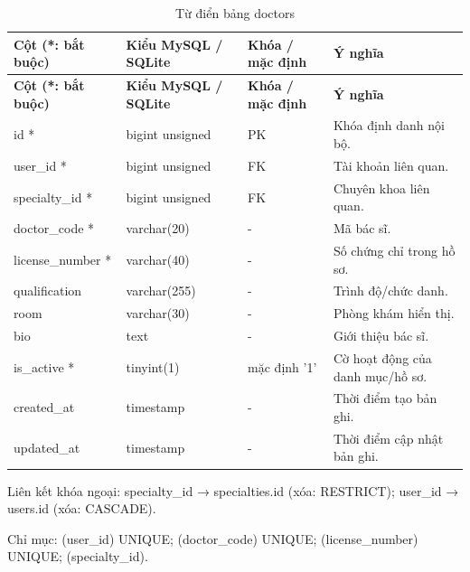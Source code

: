 {\fontsize{10}{12}\selectfont\setlength{\tabcolsep}{3pt}\renewcommand{\arraystretch}{1.12}
\begin{longtable}{@{}L{\textwidth-4.86pt\relax} L{\textwidth-3.96pt\relax} L{\textwidth-2.88pt\relax} L{\textwidth-6.3pt\relax}@{}}
\caption{Từ điển bảng doctors}\\
\toprule
\textbf{Cột (*:\allowbreak{} bắt buộc)} & \textbf{Kiểu My\allowbreak{}SQL /\allowbreak{} SQLite} & \textbf{Khóa /\allowbreak{} mặc định} & \textbf{Ý nghĩa}\\\midrule
\endfirsthead
\toprule
\textbf{Cột (*:\allowbreak{} bắt buộc)} & \textbf{Kiểu My\allowbreak{}SQL /\allowbreak{} SQLite} & \textbf{Khóa /\allowbreak{} mặc định} & \textbf{Ý nghĩa}\\\midrule
\endhead
\bottomrule\endlastfoot
id * & bigint unsigned & PK & Khóa định danh nội bộ.\allowbreak{}\\[1pt]
user\_\allowbreak{}id * & bigint unsigned & FK & Tài khoản liên quan.\allowbreak{}\\[1pt]
specialty\_\allowbreak{}id * & bigint unsigned & FK & Chuyên khoa liên quan.\allowbreak{}\\[1pt]
doctor\_\allowbreak{}code * & varchar(20) & - & Mã bác sĩ.\allowbreak{}\\[1pt]
license\_\allowbreak{}number * & varchar(40) & - & Số chứng chỉ trong hồ sơ.\allowbreak{}\\[1pt]
qualification & varchar(255) & - & Trình độ/\allowbreak{}chức danh.\allowbreak{}\\[1pt]
room & varchar(30) & - & Phòng khám hiển thị.\allowbreak{}\\[1pt]
bio & text & - & Giới thiệu bác sĩ.\allowbreak{}\\[1pt]
is\_\allowbreak{}active * & tinyint(1) & mặc định '1' & Cờ hoạt động của danh mục/\allowbreak{}hồ sơ.\allowbreak{}\\[1pt]
created\_\allowbreak{}at & timestamp & - & Thời điểm tạo bản ghi.\allowbreak{}\\[1pt]
updated\_\allowbreak{}at & timestamp & - & Thời điểm cập nhật bản ghi.\allowbreak{}\\[1pt]
\end{longtable}}
Liên kết khóa ngoại:\allowbreak{} specialty\_\allowbreak{}id → specialties.\allowbreak{}id (xóa:\allowbreak{} RESTRICT); user\_\allowbreak{}id → users.\allowbreak{}id (xóa:\allowbreak{} CASCADE).\allowbreak{}

Chỉ mục:\allowbreak{} (user\_\allowbreak{}id) UNIQUE; (doctor\_\allowbreak{}code) UNIQUE; (license\_\allowbreak{}number) UNIQUE; (specialty\_\allowbreak{}id).\allowbreak{}

